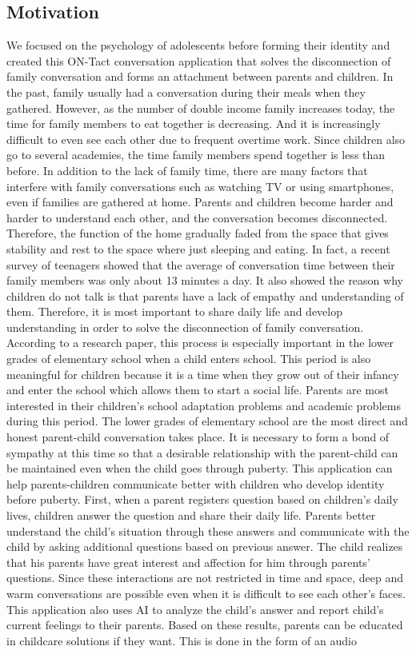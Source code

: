 \documentclass[conference]{IEEEtran}
\begin{document}
\subsection{\large{Motivation}}

We focused on the psychology of adolescents before forming their identity and created this ON-Tact conversation application that solves the disconnection of family conversation and forms an attachment between parents and children. In the past, family usually had a conversation during their meals when they gathered. However, as the number of double income family increases today, the time for family members to eat together is decreasing. And it is increasingly difficult to even see each other due to frequent overtime work. Since children also go to several academies, the time family members spend together is less than before. In addition to the lack of family time, there are many factors that interfere with family conversations such as watching TV or using smartphones, even if families are gathered at home. Parents and children become harder and harder to understand each other, and the conversation becomes disconnected. Therefore, the function of the home gradually faded from the space that gives stability and rest to the space where just sleeping and eating. In fact, a recent survey of teenagers showed that the average of conversation time between their family members was only about 13 minutes a day. It also showed the reason why children do not talk is that parents have a lack of empathy and understanding of them. Therefore, it is most important to share daily life and develop understanding in order to solve the disconnection of family conversation. According to a research paper, this process is especially important in the lower grades of elementary school when a child enters school. This period is also meaningful for children because it is a time when they grow out of their infancy and enter the school which allows them to start a social life. Parents are most interested in their children's school adaptation problems and academic problems during this period. The lower grades of elementary school are the most direct and honest parent-child conversation takes place. It is necessary to form a bond of sympathy at this time so that a desirable relationship with the parent-child can be maintained even when the child goes through puberty. This application can help parents-children communicate better with children who develop identity before puberty. First, when a parent registers question based on children's daily lives, children answer the question and share their daily life. Parents better understand the child's situation through these answers and communicate with the child by asking additional questions based on previous answer. The child realizes that his parents have great interest and affection for him through parents' questions. Since these interactions are not restricted in time and space, deep and warm conversations are possible even when it is difficult to see each other's faces. This application also uses AI to analyze the child's answer and report child’s current feelings to their parents. Based on these results, parents can be educated in childcare solutions if they want. This is done in the form of an audio 
\end{document}
